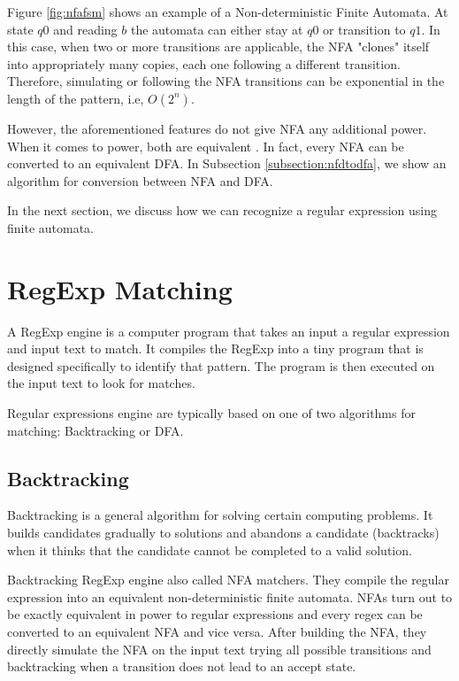 Figure \ref{fig:nfafsm} shows an example of a Non-deterministic Finite Automata. At state $q0$ and reading $b$ the automata can either stay at $q0$ or transition to $q1$. In this case, when two or more transitions are applicable, the NFA "clones" itself into appropriately many copies, each one following a different transition. Therefore, simulating or following the NFA transitions can be exponential in the length of the pattern, i.e, $O(2^n)$.

However, the aforementioned features do not give NFA any additional power. When it comes to power, both are equivalent \cite{nfadfaeq}. In fact, every NFA can be converted to an equivalent DFA. In Subsection \ref{subsection:nfdtodfa}, we show an algorithm for conversion between NFA and DFA.

In the next section, we discuss how we can recognize a regular expression using finite automata.

\newpage
\section{RegExp Matching}

A RegExp engine is a computer program that takes an input a regular expression and input text to match.
It compiles the RegExp into a tiny program that is designed specifically to identify that pattern.
The program is then executed on the input text to look for matches.

Regular expressions engine are typically based on one of two algorithms for matching: Backtracking or DFA.

\subsection{Backtracking}

Backtracking is a general algorithm for solving certain computing problems. It builds candidates gradually to solutions and abandons a candidate (backtracks) when it thinks that the candidate cannot be completed to a valid solution.

Backtracking RegExp engine also called NFA matchers. They compile the regular expression into an equivalent non-deterministic finite automata. NFAs turn out to be exactly equivalent in power to regular expressions and every regex can be converted to an equivalent NFA and vice versa. After building the NFA, they directly simulate the NFA on the input text trying all possible transitions and backtracking when a transition does not lead to an accept state.

